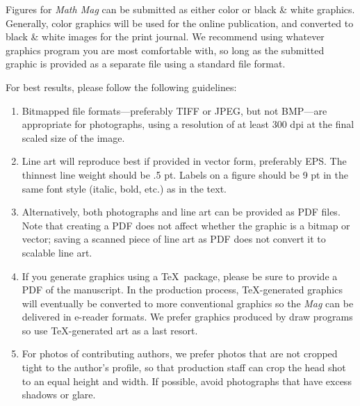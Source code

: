 \documentclass{article}
\theoremstyle{theorem}
\theoremstyle{definition}
\begin{document}
Figures for  \textit{Math Mag} can be submitted as either color or black \& white graphics.  Generally, color graphics will be used for the online publication, and converted to black \& white images for the print journal.  We recommend using whatever graphics program you are most comfortable with, so long as the submitted graphic is provided as a separate file using a standard file format.

For best results, please follow the following guidelines:
\begin{enumerate}
\item Bitmapped file formats---preferably TIFF or JPEG, but not BMP---are appropriate for photographs, using a resolution of at least 300 dpi at the final scaled size of the image.
\item Line art will reproduce best if provided in vector form, preferably EPS. The thinnest line weight should be .5 pt.  Labels on a figure should be 9 pt in the same font style (italic, bold, etc.) as in the text.
\item Alternatively, both photographs and line art can be provided as PDF files.  Note that creating a PDF does not affect whether the graphic is a bitmap or vector; saving a scanned piece of line art as PDF does not convert it to scalable line art.
\item If you generate graphics using a \TeX\ package, please be sure to provide a PDF of the manuscript.  In the production process, \TeX-generated graphics will eventually be converted to more conventional graphics so the \textit{Mag} can be delivered in e-reader formats.  We prefer graphics produced by draw programs so use \TeX-generated art as a last resort.
\item For photos of contributing authors, we prefer photos that are not cropped tight to the author's profile, so that production staff can crop the head shot to an equal height and width.  If possible, avoid photographs that have excess shadows or glare.
\end{enumerate}
\end{document}
